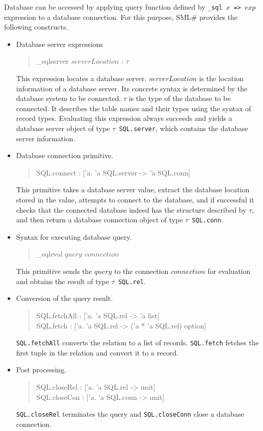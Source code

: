 \documentclass{jbook}
\newcommand{\smlsharp}{SML\#}
\newenvironment{program}{\begin{quote}\begin{tt}}%
                        {\end{tt}\end{quote}}
\begin{document}
\else%
	Database can be accessed by applying query function defined by
{\tt \_sql $x$ => $exp$} expression to a database connection.
	For this purpose, \smlsharp{} provides the following constructs.
\begin{itemize}
\item Database server expressions
\begin{program}
\_sqlserver $serverLocation$ : $\tau$
\end{program}
	This expression locates a database server.
	$serverLocation$ is the location information of a database
server.
	Its concrete syntax is determined by the database system to be
connected.
	$\tau$ is the type of the database to be connected.
	It describes the table names and their types using the syntax
of record types.
	Evaluating this expression always succeeds and  yields a
database server object of type {\tt $\tau$ SQL.server}, which contains
the database server information.
\item Database connection primitive.
\begin{program}
SQL.connect : ['a. 'a SQL.server -> 'a SQL.conn]
\end{program}
	This primitive takes a database server value, extract the
database location stored in the value, attempts to connect to the
database, and if successful it checks that the connected database
indeed has the structure described by $\tau$, and then return 
a database connection object of type {\tt $\tau$ SQL.conn}.
	
\item Syntax for executing database query.
\begin{program}
\_sqleval $query$ $connection$
\end{program}
	This primitive sends the $query$ to the connection $connection$
for evaluation and obtains the result of type {\tt $\tau$ SQL.rel}.

\item Conversion of the query result.
\begin{program}
SQL.fetchAll : ['a. 'a SQL.rel -> 'a list]\\
SQL.fetch : ['a. 'a SQL.rel -> ('a * 'a SQL.rel) option]
\end{program}
	{\tt SQL.fetchAll} converts the relation to a list of records.
	{\tt SQL.fetch} fetches the first tuple in the relation and
convert it to a record.
\item Post processing.
\begin{program}
SQL.closeRel : ['a. 'a SQL.rel -> unit]\\
SQL.closeCon : ['a. 'a SQL.conn -> unit]
\end{program}
	{\tt SQL.closeRel} terminates the query and {\tt SQL.closeConn}
close a database connection.
\end{itemize}
\fi%
		
\end{document}
